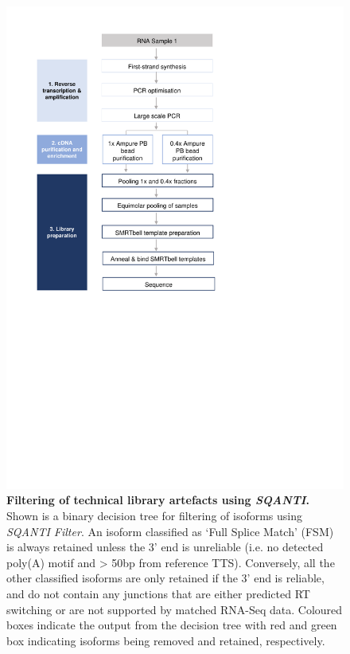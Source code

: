 \begin{figure}[!h]
	\begin{center}
		\includegraphics[page=19,trim={0 12cm 0 0},clip, scale = 0.8]{Figures/ProjectDevelopment_Figures.pdf}
	\end{center}
	\captionsetup{width=0.95\textwidth}
	\caption[Filtering of technical library artefacts using \textit{SQANTI}]%
	{\textbf{Filtering of technical library artefacts using \textit{SQANTI}.} Shown is a binary decision tree for filtering of isoforms using \textit{SQANTI Filter}. An isoform classified as ‘Full Splice Match' (FSM) is always retained unless the 3' end is unreliable (i.e. no detected poly(A) motif and > 50bp from reference TTS). Conversely, all the other classified isoforms are only retained if the 3' end is reliable, and do not contain any junctions that are either predicted RT switching or are not supported by matched RNA-Seq data. Coloured boxes indicate the output from the decision tree with red and green box indicating isoforms being removed and retained, respectively.}
	\label{fig:sqantifiltering}
\end{figure}

